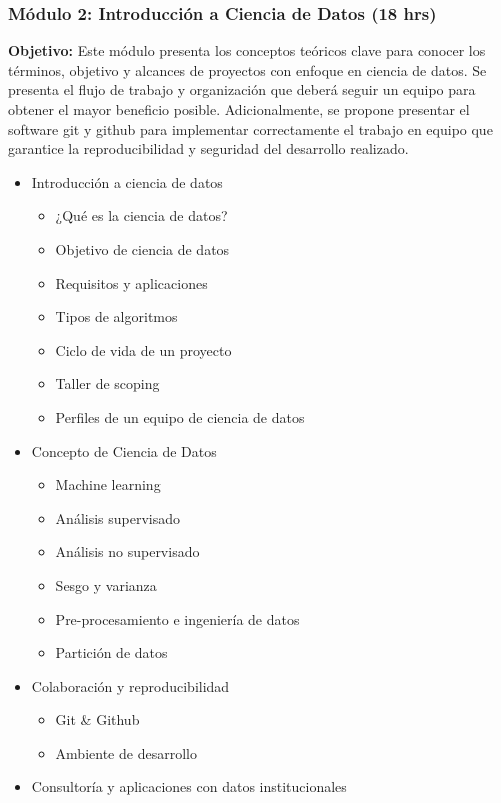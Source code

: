 \documentclass[
]{book}
\providecommand{\tightlist}{%
  \setlength{\itemsep}{0pt}\setlength{\parskip}{0pt}}
\begin{document}
\hypertarget{muxf3dulo-2-introducciuxf3n-a-ciencia-de-datos-18-hrs}{%
\subsubsection*{Módulo 2: Introducción a Ciencia de Datos (18 hrs)}\label{muxf3dulo-2-introducciuxf3n-a-ciencia-de-datos-18-hrs}}

\textbf{Objetivo:} Este módulo presenta los conceptos teóricos clave para conocer los términos, objetivo y alcances de proyectos con enfoque en ciencia de datos. Se presenta el flujo de trabajo y organización que deberá seguir un equipo para obtener el mayor beneficio posible. Adicionalmente, se propone presentar el software git y github para implementar correctamente el trabajo en equipo que garantice la reproducibilidad y seguridad del desarrollo realizado.

\begin{itemize}
\item
  Introducción a ciencia de datos

  \begin{itemize}
  \tightlist
  \item
    ¿Qué es la ciencia de datos?
  \item
    Objetivo de ciencia de datos
  \item
    Requisitos y aplicaciones
  \item
    Tipos de algoritmos
  \item
    Ciclo de vida de un proyecto
  \item
    Taller de scoping
  \item
    Perfiles de un equipo de ciencia de datos
  \end{itemize}
\item
  Concepto de Ciencia de Datos

  \begin{itemize}
  \tightlist
  \item
    Machine learning
  \item
    Análisis supervisado
  \item
    Análisis no supervisado
  \item
    Sesgo y varianza
  \item
    Pre-procesamiento e ingeniería de datos
  \item
    Partición de datos
  \end{itemize}
\item
  Colaboración y reproducibilidad

  \begin{itemize}
  \tightlist
  \item
    Git \& Github
  \item
    Ambiente de desarrollo
  \end{itemize}
\item
  Consultoría y aplicaciones con datos institucionales
\end{itemize}
\end{document}
